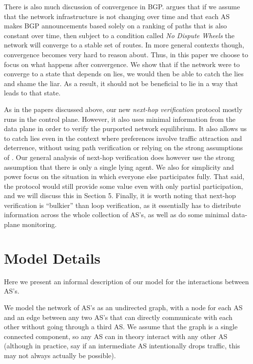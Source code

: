 \documentclass[12pt]{article}
\begin{document}
There is also much discussion of convergence in BGP. \cite{RoutingGames} argues that if we assume that the network infrastructure is not changing over time and that each AS makes BGP announcements based solely on a ranking of paths that is also constant over time, then subject to a condition called \emph{No Dispute Wheels} the network will converge to a stable set of routes. In more general contexts though, convergence becomes very hard to reason about. Thus, in this paper we choose to focus on what happens after convergence. We show that if the network were to converge to a state that depends on lies, we would then be able to catch the lies and shame the liar. As a result, it should not be beneficial to lie in a way that leads to that state.

As in the papers discussed above, our new \emph{next-hop verification} protocol mostly runs in the control plane. However, it also uses minimal information from the data plane in order to verify the purported network equilibrium. It also allows us to catch lies even in the context where preferences involve traffic attraction and deterrence, without using path verification or relying on the strong assumptions of \cite{Attraction}. Our general analysis of next-hop verification does however use the strong assumption that there is only a single lying agent. We also for simplicity and power focus on the situation in which everyone else participates fully. That said, the protocol would still provide some value even with only partial participation, and we will discuss this in Section 5. Finally, it is worth noting that next-hop verification is ``bulkier'' than loop verification, as it essentially has to distribute information across the whole collection of AS's, as well as do some minimal data-plane monitoring.


\section{Model Details}
Here we present an informal description of our model for the interactions between AS's.

We model the network of AS's as an undirected graph, with a node for each AS and an edge between any two AS's that can directly communicate with each other without going through a third AS. We assume that the graph is a single connected component, so any AS can in theory interact with any other AS (although in practice, say if an intermediate AS intentionally drops traffic, this may not always actually be possible).
\end{document}
